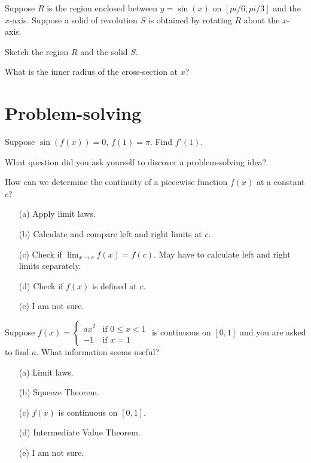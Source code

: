 \documentclass[14pt]{beamer}
\begin{document}
\begin{frame}[t]
  Suppose \(R\) is the region enclosed between \(y = \sin(x)\) on \([pi/6, pi/3]\) and the \(x\)-axis.  Suppose a solid of revolution \(S\) is obtained by rotating \(R\) about the \(x\)-axis. 

  Sketch the region \(R\) and the solid \(S\).

  What is the inner radius of the cross-section at \(x\)? 
\end{frame}

\section{Problem-solving}
\begin{frame}[t]
  Suppose \(\sin(f(x)) = 0\), \(f(1) = \pi\). Find \(f'(1)\).

  What question did you ask yourself to discover a problem-solving idea?
\end{frame}

\begin{frame}[t]
  How can we determine the continuity of a piecewise function \(f(x)\) at a constant \(c\)?

  \medskip
  \begin{itemize} \setlength\itemsep{2ex}
    \item[(a)] Apply limit laws.
    \item[(b)] Calculate and compare left and right limits at \(c\).
    \item[(c)] Check if \(\lim_{x \to c}f(x) = f(c)\). May have to calculate left and right limits separately.
    \item[(d)] Check if \(f(x)\) is defined at \(c\).
    \item[(e)] I am not sure.
  \end{itemize} 
\end{frame}

\begin{frame}[t]
  Suppose \(f(x) = \begin{cases} ax^{2} &\text{if } 0 \le x < 1 \\ -1 &\text{if } x = 1 \end{cases}\) is continuous on \([0,1]\) and you are asked to find \(a\). What information seems useful?

  \medskip
  \begin{itemize} \setlength\itemsep{2ex}
    \item[(a)] Limit laws.
    \item[(b)] Squeeze Theorem.
    \item[(c)] \(f(x)\) is continuous on \([0,1]\).
    \item[(d)] Intermediate Value Theorem.
    \item[(e)] I am not sure.
  \end{itemize} 
\end{frame}
\end{document}
